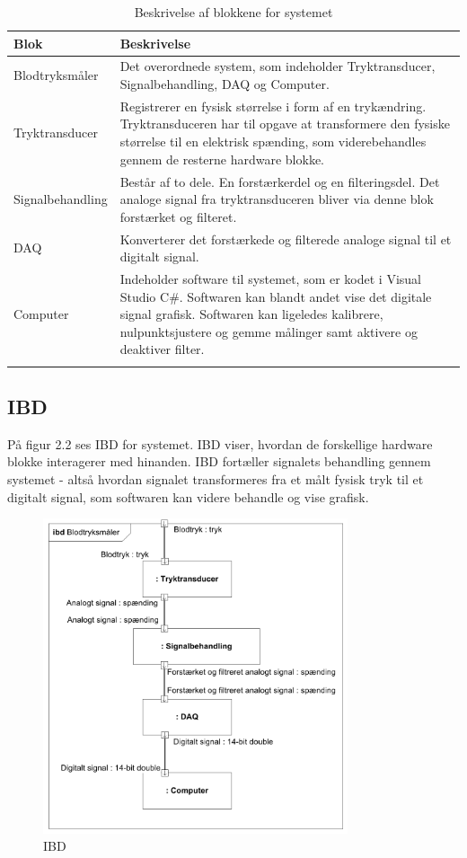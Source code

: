 \begin{longtabu} to 
	\textbf{Blok} &	\textbf{Beskrivelse} \\[-1ex]
	\midrule
	Blodtryksmåler & Det overordnede system, som indeholder Tryktransducer, Signalbehandling, DAQ og Computer.\\[-1ex]
	Tryktransducer & Registrerer en fysisk størrelse i form af en trykændring. Tryktransduceren har til opgave at transformere den fysiske størrelse til en elektrisk spænding, som viderebehandles gennem de resterne hardware blokke.  \\[-1ex]
	Signalbehandling & Består af to dele. En forstærkerdel og en filteringsdel. Det analoge signal fra tryktransduceren bliver via denne blok forstærket og filteret.\\[-1ex]
	DAQ & Konverterer det forstærkede og filterede analoge signal til et digitalt signal.\\[-1ex]
	Computer & Indeholder software til systemet, som er kodet i Visual Studio C\#. Softwaren kan blandt andet vise det digitale signal grafisk. Softwaren kan ligeledes kalibrere, nulpunktsjustere og gemme målinger samt aktivere og deaktiver filter.\\[-1ex]
	\caption{Beskrivelse af blokkene for systemet}
	\end{longtabu}
	
\subsection{IBD}
På figur 2.2 ses IBD for systemet. IBD viser, hvordan de forskellige hardware blokke interagerer med hinanden. IBD fortæller signalets behandling gennem systemet - altså hvordan signalet transformeres fra et målt fysisk tryk til et digitalt signal, som softwaren kan videre behandle og vise grafisk. 

\begin{figure}[H]
	\centering
	\includegraphics[width=0.8\textwidth]{Figurer/Snip20151209_72}
	\caption{IBD}
	\label{fig:IBD}
\end{figure}

